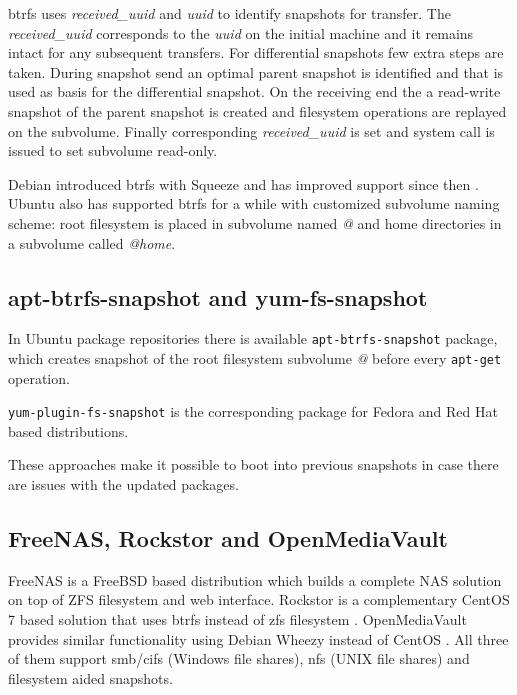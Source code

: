 \documentclass[a4paper,11pt]{kth-mag}
\begin{document}
\acrshort{btrfs} uses \emph{received\_uuid} and \emph{uuid} to
identify snapshots for transfer.
The \emph{received\_uuid} corresponds to the \emph{uuid} on
the initial machine and it remains intact for any subsequent transfers.
For differential snapshots few extra steps are taken.
During snapshot send an optimal parent snapshot is
identified and that is used as basis for the differential snapshot.
On the receiving end the a read-write snapshot of the parent
snapshot is created and filesystem operations
are replayed on the subvolume.
Finally corresponding \emph{received\_uuid} is set and
system call is issued to set subvolume read-only.

Debian introduced \acrshort{btrfs} with Squeeze and has improved support
since then \cite{debian-btrfs}.
Ubuntu also has supported \acrshort{btrfs} for a while with customized
subvolume naming scheme:
root filesystem is placed in subvolume named \emph{@}
and home directories in a subvolume called \emph{@home}.

\subsection{apt-btrfs-snapshot and yum-fs-snapshot}

In Ubuntu package repositories there is available
\lstinline!apt-btrfs-snapshot!
\cite{apt-btrfs-snapshot}
package,
which creates snapshot of the root filesystem subvolume \emph{@}
before every \lstinline!apt-get! operation.

\lstinline!yum-plugin-fs-snapshot!
\cite{yum-fs-snapshot}
is the corresponding package for Fedora and
Red Hat based distributions.

These approaches make it possible to boot into previous snapshots
in case there are issues with the updated packages.

\subsection{FreeNAS, Rockstor and OpenMediaVault}

FreeNAS is a FreeBSD \cite{freenas}
based distribution which builds a complete NAS solution on top of
ZFS filesystem and web interface.
Rockstor is a complementary CentOS 7 based solution that uses \acrshort{btrfs} instead
of \acrshort{zfs} filesystem \cite{rockstor}.
OpenMediaVault provides similar functionality using Debian Wheezy
instead of CentOS \cite{openmediavault}.
All three of them support \acrshort{smb}/\acrshort{cifs} (Windows file shares),
\acrshort{nfs} (UNIX file shares) and filesystem aided snapshots.
\end{document}
